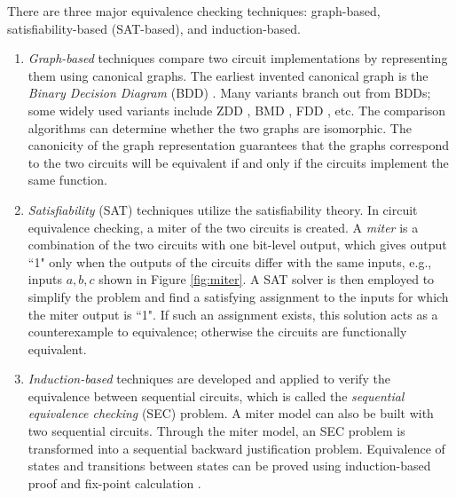 There are three major
equivalence checking techniques: graph-based,
satisfiability-based (SAT-based), and induction-based.
\begin{enumerate}[{1)}]
\item \emph{Graph-based} techniques compare two circuit implementations 
by representing them using canonical graphs. 
The earliest invented canonical graph is the \emph{Binary Decision Diagram} (BDD) \cite{BRYA86}.
Many variants branch out from BDDs; some widely used variants include 
ZDD \cite{minato1993zero}, BMD \cite{bmd}, FDD \cite{okfdd}, etc. The comparison algorithms can 
determine whether the two graphs are isomorphic. The canonicity of the graph representation guarantees that
the graphs correspond to the two circuits will be 
equivalent if and only if the circuits implement the same function.
\item \emph{Satisfiability} (SAT) techniques utilize the satisfiability theory.
In circuit equivalence checking, a miter of the two circuits is created.
A \emph{miter} is a combination of the two circuits with one bit-level output, which 
gives output ``1" only when the outputs of the circuits differ with 
the same inputs, e.g., inputs $a,b,c$ shown in Figure \ref{fig:miter}. 
A SAT solver \cite{csat,mishchenko2006improvements} is then employed to simplify the problem 
and find a satisfying assignment to the inputs for which the 
miter output is ``1". If such an assignment exists, this solution acts as a 
counterexample to equivalence; otherwise the circuits
are functionally equivalent.
\item \emph{Induction-based} techniques are developed and applied to verify the 
equivalence between sequential circuits, which is called the {\it sequential equivalence checking}
(SEC) problem. A miter model can also be built with two sequential circuits. Through the 
miter model, an SEC problem is transformed into a sequential backward justification problem.
Equivalence of states and transitions between states can be proved using induction-based 
proof and fix-point calculation \cite{bjesse2000sat,stoffel1997record}.
\end{enumerate}


\begin{figure}[bp]
\end{figure}

